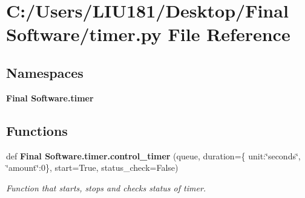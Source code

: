 \section{C\+:/\+Users/\+L\+I\+U181/\+Desktop/\+Final Software/timer.py File Reference}
\label{timer_8py}
\subsection*{Namespaces}
\begin{DoxyCompactItemize}
\item 
 \textbf{ Final Software.\+timer}
\end{DoxyCompactItemize}
\subsection*{Functions}
\begin{DoxyCompactItemize}
\item 
def \textbf{ Final Software.\+timer.\+control\+\_\+timer} (queue, duration=\{ \textquotesingle{}unit\textquotesingle{}\+:\char`\"{}seconds\char`\"{}, \char`\"{}amount\char`\"{}\+:0\}, start=True, status\+\_\+check=False)
\begin{DoxyCompactList}\small\item\em Function that starts, stops and checks status of timer. \end{DoxyCompactList}\end{DoxyCompactItemize}
